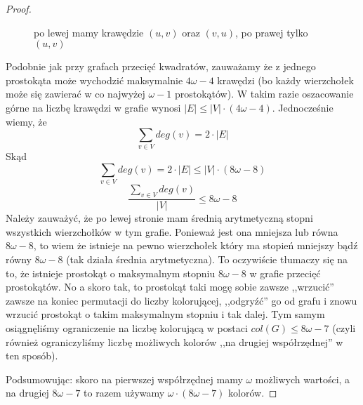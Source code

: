 \begin{proof}
\begin{figure}[H]
		\caption{po lewej mamy krawędzie \((u, v)\) oraz \((v, u)\), po prawej tylko \((u, v)\)}
	\end{figure}

	Podobnie jak przy grafach przecięć kwadratów, zauważamy że z jednego prostokąta może wychodzić maksymalnie \(4\omega - 4\) krawędzi (bo każdy wierzchołek może się zawierać w co najwyżej \(\omega - 1\) prostokątów).
	W takim razie oszacowanie górne na liczbę krawędzi w grafie wynosi \(|E| \leq |V| \cdot (4\omega - 4)\). Jednocześnie wiemy, że \begin{equation*}
		\sum_{v \in V} deg(v) = 2 \cdot |E|
	\end{equation*}
	Skąd
	\begin{equation*}
		\sum_{v \in V} deg(v) = 2 \cdot |E| \leq |V| \cdot (8 \omega - 8)
	\end{equation*}
	\begin{equation*}
		\frac{\sum_{v \in V} deg(v)}{|V|} \leq 8 \omega - 8
	\end{equation*}
	Należy zauważyć, że po lewej stronie mam średnią arytmetyczną stopni wszystkich wierzchołków w tym grafie. Ponieważ jest ona mniejsza lub równa \(8 \omega - 8\), to wiem że istnieje na pewno wierzchołek który ma stopień mniejszy bądź równy \(8\omega - 8\) (tak działa średnia arytmetyczna). To oczywiście tłumaczy się na to, że istnieje prostokąt o maksymalnym stopniu \(8\omega - 8\) w grafie przecięć prostokątów. No a skoro tak, to prostokąt taki mogę sobie zawsze ,,wrzucić'' zawsze na koniec permutacji do liczby kolorującej, ,,odgryźć'' go od grafu i znowu wrzucić prostokąt o takim maksymalnym stopniu i tak dalej. Tym samym osiągnęliśmy ograniczenie na liczbę kolorującą w postaci \(col(G) \leq 8\omega - 7\) (czyli również ograniczyliśmy liczbę możliwych kolorów ,,na drugiej współrzędnej'' w ten sposób).

	Podsumowując: skoro na pierwszej współrzędnej mamy \(\omega\) możliwych wartości, a na drugiej \(8\omega - 7\) to razem używamy \(\omega \cdot (8\omega - 7)\) kolorów.

\end{proof}
